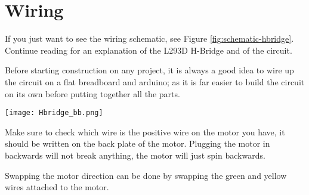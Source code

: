 \documentclass[../TinyBot.tex]{subfiles}
\begin{document}
\section{Wiring} \label{wiring}
If you just want to see the wiring schematic, see Figure \ref{fig:schematic-hbridge}. Continue reading for an explanation of the L293D H-Bridge and of the circuit. 

\bigskip

Before starting construction on any project, it is always a good idea to wire up the circuit on a flat breadboard and arduino; as it is far easier to build the circuit on its own before putting together all the parts. \\




\begin{center}
    \texttt{[image: Hbridge\_bb.png]}
    \label{fig:schematic-hbridge}
\end{center}

Make sure to check which wire is the positive wire on the motor you have, it should be written on the back plate of the motor. Plugging the motor in backwards will not break anything, the motor will just spin backwards. 

Swapping the motor direction can be done by swapping the green and yellow wires attached to the motor. 
\end{document}
